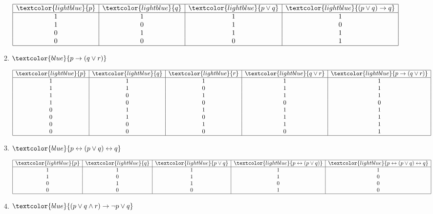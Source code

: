\documentclass{article}
\newcommand{\lb}[1]{\textcolor{lightblue}{#1}}
\newcommand{\db}[1]{\textcolor{blue}{#1}}
\begin{document}
\begin{enumerate}[label=\color{red}\textbf{\arabic*)}, leftmargin=*]
\begin{enumerate}[label=\color{red}\alph*)]
            $\begin{array}{|c|c|c|c|}
            \hline
            \lb{p} & \lb{q} & \lb{p\vee q} & \lb{(p\vee q)\to q} \\  \hline
            1 & 1 & 1 & 1 \\ 
            1 & 0 & 1 & 0 \\ 
            0 & 1 & 1 & 1 \\ 
            0 & 0 & 0 & 1 \\ \hline
            \end{array} $
            \item $\db{p\to(q\vee r)}$
            
            $\begin{array}{|c|c|c|c|c|}
            \hline
            \lb{p} & \lb{q} & \lb{r} & \lb{q\vee r} & \lb{p\to(q\vee r)} \\  \hline
            1 & 1 & 1 & 1 & 1 \\ 
            1 & 1 & 0 & 1 & 1 \\ 
            1 & 0 & 1 & 1 & 1 \\ 
            1 & 0 & 0 & 0 & 0 \\ 
            0 & 1 & 1 & 1 & 1 \\ 
            0 & 1 & 0 & 1 & 1 \\ 
            0 & 0 & 1 & 1 & 1 \\ 
            0 & 0 & 0 & 0 & 1 \\ \hline
            \end{array} $
            \item $\db{p\leftrightarrow(p\vee q)\leftrightarrow q}$
            
            $\begin{array}{|c|c|c|c|c|}
            \hline
            \lb{p} & \lb{q} & \lb{p\vee q} & \lb{p\leftrightarrow (p\vee q)} & \lb{p\leftrightarrow(p\vee q)\leftrightarrow q} \\  \hline
            1 & 1 & 1 & 1 & 1 \\ 
            1 & 0 & 1 & 1 & 0 \\ 
            0 & 1 & 1 & 0 & 0 \\ 
            0 & 0 & 0 & 1 & 0 \\ \hline
            \end{array} $
            \item $\db{(p\vee q\wedge r)\to\neg p\vee q}$
            

\end{enumerate}
\end{enumerate}
\end{document}
